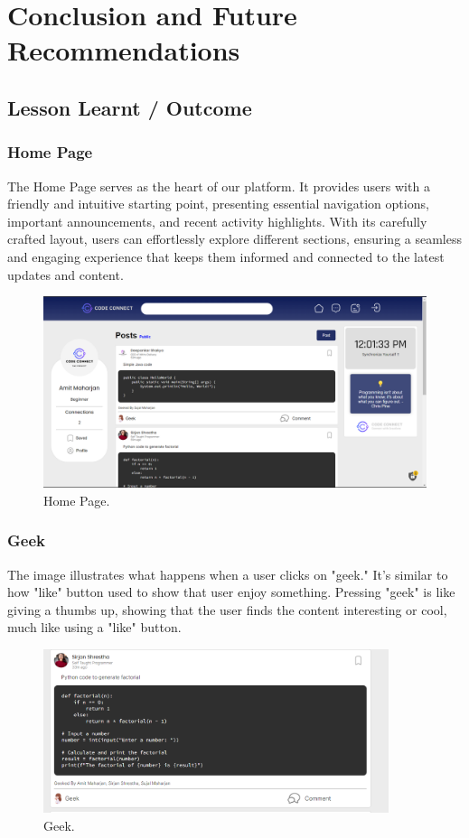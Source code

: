 \chapter{Conclusion and Future Recommendations}

\section{Lesson Learnt / Outcome}

\subsection{Home Page}
The Home Page serves as the heart of our platform. It provides users with a friendly and intuitive starting point, presenting essential navigation options, important announcements, and recent activity highlights. With its carefully crafted layout, users can effortlessly explore different sections, ensuring a seamless and engaging experience that keeps them informed and connected to the latest updates and content.
\begin{figure}[H]
    \centering
    \includegraphics[width=1\textwidth]{Outcome-ss/homepage.png}
    \caption{Home Page.}
    \label{fig:Home Page}
\end{figure}

\newpage
\subsection{Geek}
The image illustrates what happens when a user clicks on "geek." It's similar to how "like" button used to show that user enjoy something. Pressing "geek" is like giving a thumbs up, showing that the user finds the content interesting or cool, much like using a "like" button.
\begin{figure}[H]
    \centering
    \includegraphics[width=0.9\textwidth]{Outcome-ss/geek.png}
    \caption{Geek.}
    \label{fig:Geek}
\end{figure}

